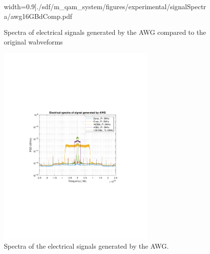 \begin{figure}[H]
\begin{minipage}{0.45\textwidth}
			width=0.9\textwidth]{./sdf/m_qam_system/figures/experimental/signalSpectra/awg16GBdComp.pdf}
			\subcaption{\label{fig:awg16gb}}
		\end{minipage}
		\caption{Spectra of electrical signals generated by the AWG compared to the original wabveforms\label{fig:awgvsraw}}
	\end{figure}

	\begin{figure}[H]
		\centering
		\includegraphics[clip, trim=3cm 8cm 3cm 8cm,
		width=0.7\textwidth]{./sdf/m_qam_system/figures/experimental/signalSpectra/AWG_spectra.pdf}
		\caption{Spectra of the electrical signals generated by the AWG.\label{fig:awgSpectra}}
	\end{figure}

